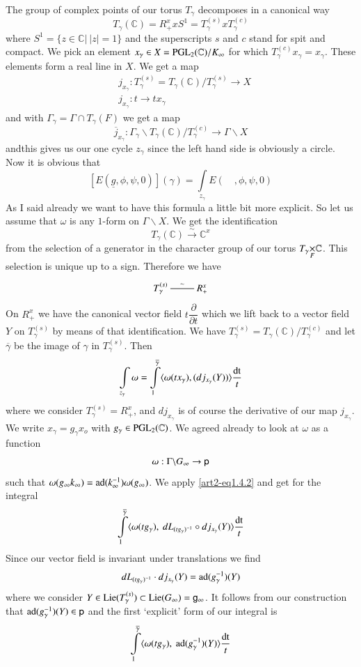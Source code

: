 The group of complex points of our torus $T_{\gamma}$ decomposes in a canonical way
$$
T_{\gamma}(\mathbb{C})=R^{x}_{+}xS^{1}=T^{(s)}_{\gamma}xT^{(c)}_{\gamma}
$$
where $S^{1}=\{z\in \mathbb{C}|~|z|=1\}$ and the superscripts $s$ and $c$ stand for spit and compact. We pick an element $x_{\gamma}\in X=\mathrm{PGL}_{2}(\mathbb{C})/K_{\infty}$ for which $T^{(c)}_{\gamma}x_{\gamma}=x_{\gamma}$. These elements form a real line in $X$. We get a map
\begin{align*}
& j_{x_{\gamma}}:T^{(s)}_{\gamma}=T_{\gamma}(\mathbb{C})/T^{(s)}_{\gamma}\to X\\
& j_{x_{\gamma}}:t\to tx_{\gamma}
\end{align*}
and with $\Gamma_{\gamma}=\Gamma\cap T_{\gamma}(F)$ we get a map
$$
\overline{j}_{x_{\gamma}}:\Gamma_{\gamma}\backslash T_{\gamma}(\mathbb{C})/T^{(c)}_{\gamma}\to \Gamma\backslash X
$$
\eject
\noindent
and\pageoriginale this gives us our one cycle $z_{\gamma}$ since the left hand side is obviously a circle. Now it is obvious that
$$
[E(\underline{g},\phi,\psi,0)](\gamma)=\int\limits_{z_{\gamma}}E(\quad,\phi,\psi,0)
$$
As I said already we want to have this formula a little bit more explicit. So let us assume that $\omega$ is any $1$-form on $\Gamma\backslash X$. We get the identification
$$
T_{\gamma}(\mathbb{C})\xrightarrow{\sim}\mathbb{C}^{x}
$$
from the selection of a generator in the character group of our torus $\fprod{T_{\gamma}}{\mathbb{C}}{F}$. This selection is unique up to a sign. Therefore we have
\[
\xymatrix{
T^{(s)}_{\gamma}\ar@{-}[r]^-{\sim} & R^{x}_{+}
}
\]
On $R^{x}_{+}$ we have the canonical vector field $t\dfrac{\partial}{\partial t}$ which we lift back to a vector field $Y$ on $T^{(s)}_{\gamma}$ by means of that identification. We have $T^{(s)}_{\gamma}=T_{\gamma}(\mathbb{C})/T^{(c)}_{\gamma}$ and let $\overline{\gamma}$ be the image of $\gamma$ in $T^{(s)}_{\gamma}$. Then
$$
\int\limits_{z_{\gamma}}\omega=\int\limits^{\overline{\gamma}}_{1}\langle \omega(tx_{\gamma}),(dj_{x_{\gamma}}(Y))\rangle \dfrac{\operatorname{dt}}{t}
$$
where we consider $T^{(s)}_{\gamma}=R^{x}_{+}$, and $dj_{x_{\gamma}}$ is of course the derivative of our map $j_{x_{\gamma}}$. We write $x_{\gamma}=g_{\gamma}x_{o}$ with $g_{\gamma}\in \mathrm{PGL}_{2}(\mathbb{C})$. We agreed already to look at $\omega$ as a function
$$
\omega:\Gamma\backslash G_{\infty}\to\mathsf{p}
$$
such that $\omega(g_{\infty}k_{\infty})=\operatorname{ad}(k^{-1}_{\infty})\omega(g_{\infty})$. We apply \eqref{art2-eq1.4.2} and get for the integral
$$
\int\limits^{\overline{\gamma}}_{1}\langle \omega(tg_{\gamma}), \ dL_{(tg_{\gamma})^{-1}}\circ dj_{x_{\gamma}}(Y)\rangle \dfrac{\operatorname{dt}}{t}
$$
Since our vector field is invariant under translations we find
$$
dL_{(tg_{\gamma})^{-1}}\cdot dj_{x_{\gamma}}(Y)=\operatorname{ad}(g^{-1}_{\gamma})(Y)
$$
where we consider $Y\in \operatorname{Lie} (T^{(s)}_{\gamma})\subset \operatorname{Lie} (G_{\infty})=\mathsf{g}_{\infty}$. It follows from our construction that $\operatorname{ad}(g^{-1}_{\gamma})(Y)\in \mathsf{p}$ and the first `explicit' form of our integral is
\setcounter{equation}{0}
\begin{equation}
\int\limits^{\overline{\gamma}}_{1}\langle \omega(tg_{\gamma}), \ \operatorname{ad}(g^{-1}_{\gamma})(Y)\rangle \dfrac{\operatorname{dt}}{t}\label{art2-eq3.1.1}
\end{equation}

